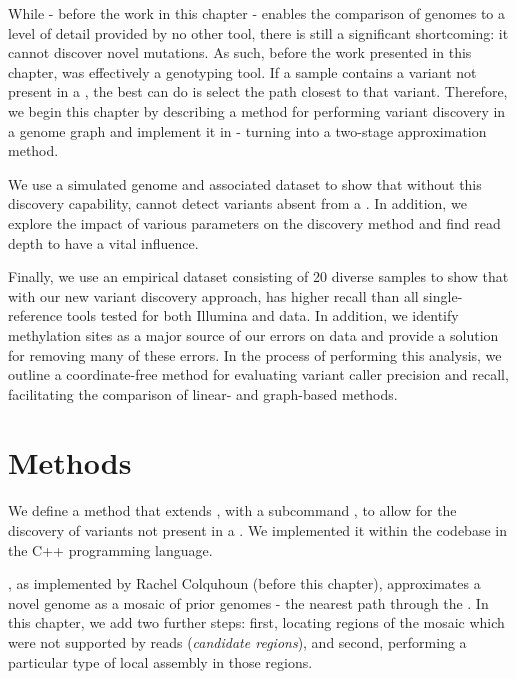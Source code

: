 While \pandora{} - before the work in this chapter - enables the comparison of genomes to a level of detail provided by no other tool, there is still a significant shortcoming: it cannot discover novel mutations. As such, before the work presented in this chapter, \pandora{} was effectively a genotyping tool. If a sample contains a variant not present in a \prg{}, the best \pandora{} can do is select the path closest to that variant. Therefore, we begin this chapter by describing a method for performing \denovo{} variant discovery in a genome graph and implement it in \pandora{} - turning \pandora{} into a two-stage approximation method.

We use a simulated genome and associated \ont{} dataset to show that without this discovery capability, \pandora{} cannot detect variants absent from a \prg{}. In addition, we explore the impact of various parameters on the \denovo{} discovery method and find read depth to have a vital influence.

Finally, we use an empirical dataset consisting of 20 diverse \ecoli{} samples to show that with our new variant discovery approach, \pandora{} has higher recall than all single-reference tools tested for both Illumina and \ont{} data. In addition, we identify methylation sites as a major source of our errors on \ont{} data and provide a solution for removing many of these errors. In the process of performing this analysis, we outline a coordinate-free method for evaluating variant caller precision and recall, facilitating the comparison of linear- and graph-based methods. 

\section{Methods}
\label{sec:denovo-method}

We define a method that extends \pandora{}, with a subcommand , to allow for the \denovo{} discovery of variants not present in a \prg{}. We implemented it within the \pandora{} codebase in the C++ programming language. 

\pandora{}, as implemented by Rachel Colquhoun (before this chapter), approximates a novel genome as a mosaic of prior genomes - the nearest path through the \panrg{}. In this chapter, we add two further steps: first, locating regions of the mosaic which were not supported by reads (\emph{candidate regions}), and second, performing a particular type of local assembly in those regions.

